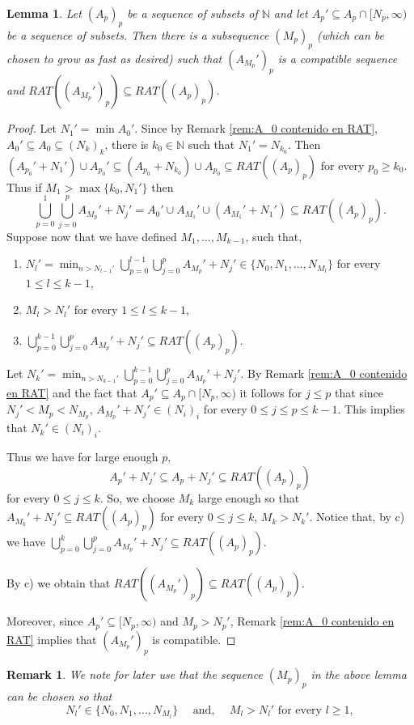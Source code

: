 \documentclass[11pt]{amsart}
\newtheorem{lemma}[theorem]{Lemma}
\newtheorem{remark}[theorem]{Remark}
\newcommand{\zN}{\mathbb N}
\newcommand{\sub}{\subseteq}
\begin{document}
{ 
\begin{lemma}\label{lem: RAT subconjuntos}
    Let $(A_p)_p$ be a sequence of subsets of $\zN$  and let  $A_p'\sub A_p\cap [N_p,\infty)$ be  a sequence of subsets. Then  there is a subsequence  $(M_p)_p$ (which can be chosen to grow as fast as desired)  such that 
    $(A_{M_p}')_p$ is a compatible sequence and $RAT((A_{M_p}')_p)\sub RAT((A_p)_p)$.
\end{lemma}

\begin{proof}
Let $N_1'=\min A_0'$. Since by Remark \ref{rem:A_0 contenido en RAT}, $A_0'\sub A_0\sub (N_k)_k$, there is $k_0\in \zN$ such that $N_1'=N_{k_0}$. 
Then $(A_{p_0}'+N_1')\cup A_{p_0}'\sub  (A_{p_0}+N_{k_0})\cup A_{p_0}\subseteq RAT((A_p)_p)$ for every $p_0\ge k_0$.
Thus if $M_1>\max\{k_0,N_1'\}$ then 
$$
\bigcup_{p=0}^{1} \bigcup_{j=0}^p A_{M_p}'+N_j'= A_0'\cup A_{M_1}'\cup (A_{M_1}'+N_1')\subseteq RAT((A_p)_p).
$$
Suppose now that we have defined $M_1,\ldots,M_{k-1}$, such that, 
\begin{enumerate}
    \item[a)] $N_{l}'=\min_{n>N_{l-1}'} \bigcup_{p=0}^{l-1} \bigcup_{j=0}^p A_{M_p}'+N_j' \in \{N_0,N_1,\dots,N_{M_l}\}$ for every $1\leq l\leq k-1$,
   \item[b)] $M_{l}>N_l'$ for every $1\leq l\leq k-1$,
    \item [c)]$\bigcup_{p=0}^{k-1} \bigcup_{j=0}^p A_{M_p}'+N_j'\subseteq RAT((A_p)_p)$.
\end{enumerate}

 
Let $N_k'=\min_{n>N_{k-1}'}\bigcup_{p=0}^{k-1} \bigcup_{j=0}^p A_{M_p}'+N_j'$. By Remark \ref{rem:A_0 contenido en RAT} and the fact that $A_p'\sub A_p\cap [N_p,\infty)$ it follows for $j\le p$ that since $N_j'<M_p<N_{M_p}$,  $A_{M_p}'+N_j' \in (N_i)_i$ for every $0\le j\le p\le k-1$. This implies that $N_k'\in (N_i)_i$. 


Thus we have for large enough $p$, 
\begin{equation*}
    A_{p}'+N_j'\subseteq A_p+ N_j'\subseteq RAT((A_p)_p)
\end{equation*} 
for every $0\leq j\leq k$. So, we choose  $M_k$ large enough so that $A_{M_{k}}'+N_j'\subseteq RAT((A_p)_p)$ for every $0\leq j\leq k$, $M_k>N_k'$. Notice that, by c) we have  $\bigcup_{p=0}^{k} \bigcup_{j=0}^p A_{M_p}'+N_j'\subseteq RAT((A_p)_p)$.



By c) we obtain that $RAT((A_{M_p}')_p)\subseteq RAT((A_{p})_p)$.

Moreover, since $A_p'\sub [N_p,\infty)$ and  $M_p>N_p'$, Remark \ref{rem:A_0 contenido en RAT} implies that $(A_{M_p}')_p$ is compatible.
\end{proof}
\begin{remark}
    \label{rem: cosas del lemma que usamos}
We note for later use that the sequence $(M_p)_p$ in the above lemma can be chosen so that 
$$
N_{l}'\in \{N_0,N_1,\dots,N_{M_l}\}  \quad \text{ and, }\quad M_{l}>N_l' \text{ for every }l\ge1,
$$
\end{remark}
}
\end{document}

